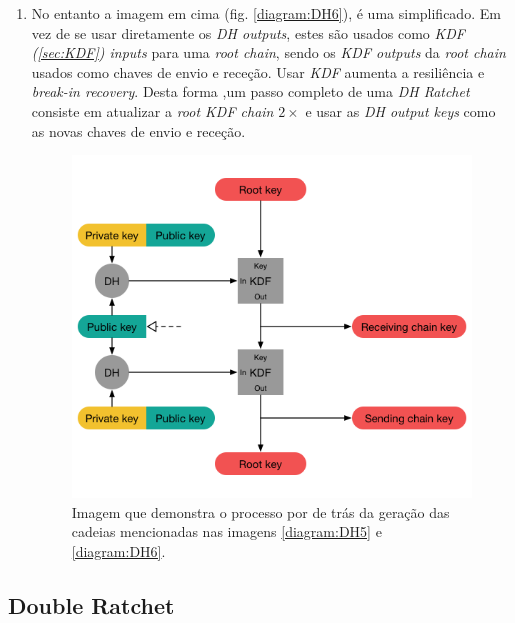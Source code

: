 \begin{enumerate}
    \item No entanto a imagem em cima (fig. \ref{diagram:DH6}), é uma simplificado. Em vez de se usar diretamente os \textit{DH outputs}, estes são usados como \textit{KDF (\ref{sec:KDF}) inputs} para uma \textit{root chain}, sendo os \textit{KDF outputs} da \textit{root chain} usados como chaves de envio e receção. Usar \textit{KDF} aumenta a resiliência e \textit{break-in recovery}.
    Desta forma ,um passo completo de uma \textit{DH Ratchet} consiste em atualizar a \textit{root KDF chain} $2\times$ e usar as \textit{DH output keys} como as novas chaves de envio e receção.

    \begin{figure}[H]
        \begin{center}
            \includegraphics[width=12cm]{img/DH7.png}
            \caption{Imagem que demonstra o processo por de trás da geração das cadeias mencionadas nas imagens \ref{diagram:DH5} e \ref{diagram:DH6}.}
            \label{diagram:DH7}
        \end{center}
    \end{figure}
    
\end{enumerate}

\subsection{Double Ratchet}\label{sec:DoubleRatchet}

